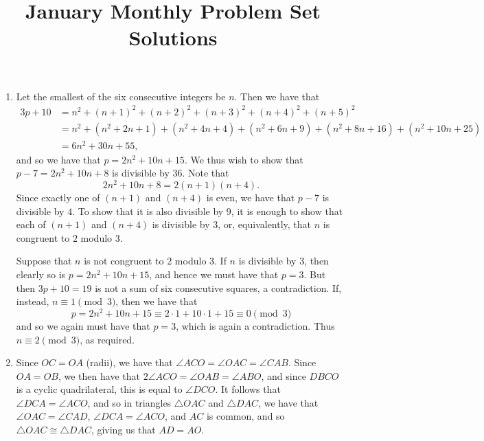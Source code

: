 \documentclass[12pt]{article}
\title{\vspace{-24pt}January Monthly Problem Set Solutions}
\author{\vspace{-24pt}}
\date{\vspace{-24pt}}
\begin{document}
 \maketitle

\begin{enumerate}

\item %

Let the smallest of the six consecutive integers be $n$. Then we have that
\begin{align*}
    3p + 10 & = n^2 + (n + 1)^2 + (n + 2)^2 + (n + 3)^2 + (n + 4)^2 + (n + 5)^2
    \\
    & = n^2 + (n^2 + 2n + 1) + (n^2 + 4n + 4) + (n^2 + 6n + 9) + (n^2 + 8n + 16)
    + (n^2 + 10n + 25) \\
    & = 6n^2 + 30n + 55,
\end{align*}
and so we have that $p = 2n^2 + 10n + 15$. We thus wish to show that $p - 7 =
2n^2 + 10n + 8$ is divisible by $36$. Note that
\[
    2n^2 + 10n + 8 = 2(n + 1)(n + 4).
\]
Since exactly one of $(n + 1)$ and $(n + 4)$ is even, we have that $p - 7$ is
divisible by $4$. To show that it is also divisible by $9$, it is enough to show
that each of $(n + 1)$ and $(n + 4)$ is divisible by $3$, or, equivalently, that
$n$ is congruent to $2$ modulo $3$. 
        
Suppose that $n$ is not congruent to $2$ modulo $3$. If $n$ is divisible by $3$,
then clearly so is $p = 2n^2 + 10n + 15$, and hence we must have that $p = 3$.
But then $3p + 10 = 19$ is not a sum of six consecutive squares, a
contradiction. If, instead, $n \equiv 1 \pmod 3$, then we have that
\[
    p = 2n^2 + 10n + 15 \equiv 2 \cdot 1 + 10 \cdot 1 + 15 \equiv 0 \pmod 3
\]
and so we again must have that $p = 3$, which is again a contradiction. Thus $n
\equiv 2 \pmod 3$, as required.
        

 \item %
Since $OC = OA$ (radii), we have that $\angle ACO = \angle OAC = \angle CAB$.
Since $OA = OB$, we then have that $2\angle ACO = \angle OAB = \angle ABO$, and
since $DBCO$ is a cyclic quadrilateral, this is equal to $\angle DCO$. It
follows that $\angle DCA = \angle ACO$, and so in triangles $\triangle OAC$ and
$\triangle DAC$, we have that $\angle OAC = \angle CAD$, $\angle DCA = \angle
ACO$, and $AC$ is common, and so $\triangle OAC \cong \triangle DAC$, giving us
that $AD = AO$.


\end{enumerate}
\end{document}
